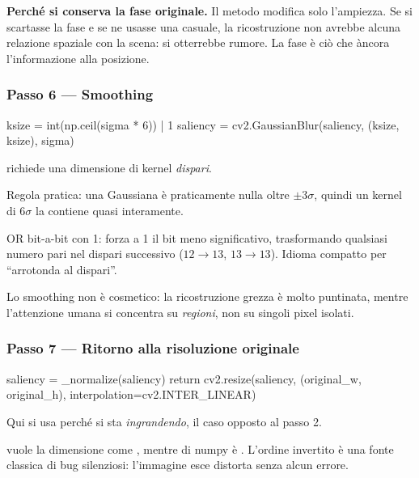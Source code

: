 \begin{nota}
\textbf{Perché si conserva la fase originale.} Il metodo modifica solo l'ampiezza. Se si
scartasse la fase e se ne usasse una casuale, la ricostruzione non avrebbe alcuna relazione
spaziale con la scena: si otterrebbe rumore. La fase è ciò che àncora l'informazione alla
posizione.
\end{nota}

\subsubsection{Passo 6 --- Smoothing}

\begin{idebox}
\begin{pycode}
ksize = int(np.ceil(sigma * 6)) | 1
saliency = cv2.GaussianBlur(saliency, (ksize, ksize), sigma)
\end{pycode}
\end{idebox}

 richiede una dimensione di kernel \emph{dispari}.

\begin{description}[leftmargin=1.2em,style=nextline]
\item[\pyin{sigma * 6}] Regola pratica: una Gaussiana è praticamente nulla oltre $\pm 3\sigma$,
quindi un kernel di $6\sigma$ la contiene quasi interamente.
\item[\pyin{| 1}] OR bit-a-bit con 1: forza a 1 il bit meno significativo, trasformando qualsiasi
numero pari nel dispari successivo ($12 \to 13$, $13 \to 13$). Idioma compatto per ``arrotonda al
dispari''.
\end{description}

Lo smoothing non è cosmetico: la ricostruzione grezza è molto puntinata, mentre l'attenzione
umana si concentra su \emph{regioni}, non su singoli pixel isolati.

\subsubsection{Passo 7 --- Ritorno alla risoluzione originale}

\begin{idebox}
\begin{pycode}
saliency = _normalize(saliency)
return cv2.resize(saliency, (original_w, original_h),
                  interpolation=cv2.INTER_LINEAR)
\end{pycode}
\end{idebox}

Qui si usa  perché si sta \emph{ingrandendo}, il caso opposto al passo 2.

\begin{attenzione}
 vuole la dimensione come , mentre  di numpy è
. L'ordine invertito è una fonte classica di bug silenziosi: l'immagine
esce distorta senza alcun errore.
\end{attenzione}
